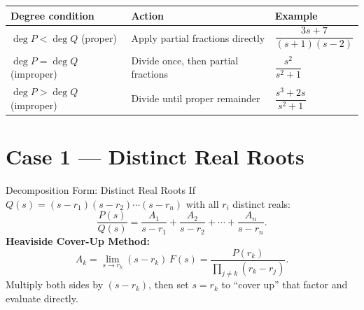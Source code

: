 \documentclass[12pt,a4paper]{article}
\begin{document}
\begin{center}
\begin{tabular}{@{}lll@{}}
\toprule
\textbf{Degree condition} & \textbf{Action} & \textbf{Example} \\
\midrule
$\deg P < \deg Q$ (proper) & Apply partial fractions directly &
  $\dfrac{3s+7}{(s+1)(s-2)}$ \\
\addlinespace
$\deg P = \deg Q$ (improper) & Divide once, then partial fractions &
  $\dfrac{s^2}{s^2+1}$ \\
\addlinespace
$\deg P > \deg Q$ (improper) & Divide until proper remainder &
  $\dfrac{s^3+2s}{s^2+1}$ \\
\bottomrule
\end{tabular}
\end{center}

\section{Case 1 --- Distinct Real Roots}
\begin{infobox}{Decomposition Form: Distinct Real Roots}
If $Q(s) = (s-r_1)(s-r_2)\cdots(s-r_n)$ with all $r_i$ distinct reals:
\[
  \frac{P(s)}{Q(s)} = \frac{A_1}{s-r_1} + \frac{A_2}{s-r_2}
  + \cdots + \frac{A_n}{s-r_n}.
\]
\textbf{Heaviside Cover-Up Method:}
\[
  A_k = \lim_{s \to r_k} (s - r_k)\,F(s)
       = \frac{P(r_k)}{\prod_{j\neq k}(r_k - r_j)}.
\]
Multiply both sides by $(s-r_k)$, then set $s = r_k$ to ``cover up'' that
factor and evaluate directly.
\end{infobox}
\end{document}
